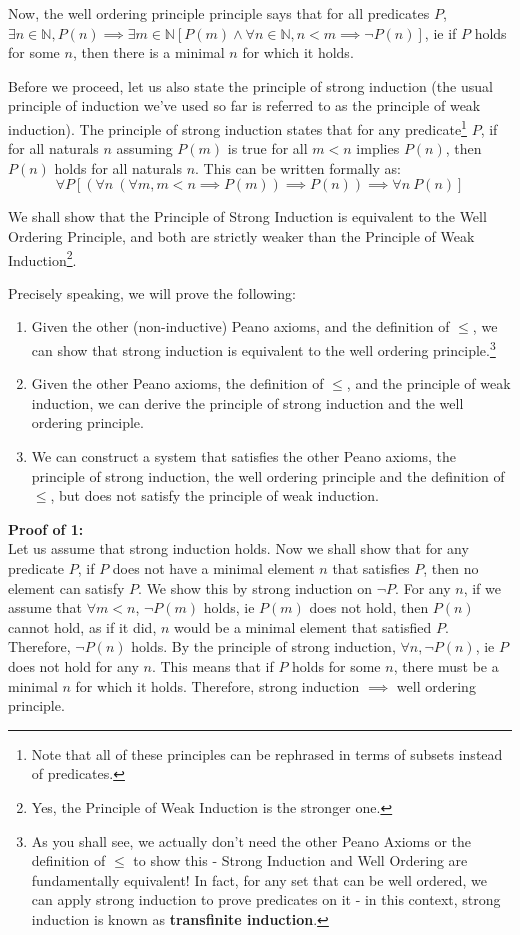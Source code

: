 \documentclass[12pt]{report}
\begin{document}
Now, the well ordering principle principle says that for all predicates $P$, $\exists n \in \mathbb{N}, P(n) \implies \exists m \in \mathbb{N} \left[P(m) \land \forall n \in \mathbb{N}, n < m \implies \neg P(n)\right]$, ie if $P$ holds for some $n$, then there is a minimal $n$ for which it holds. 

Before we proceed, let us also state the principle of strong induction (the usual principle of induction we've used so far is referred to as the principle of weak induction). The principle of strong induction states that for any predicate\footnote{Note that all of these principles can be rephrased in terms of subsets instead of predicates.} $P$, if for all naturals $n$ assuming $P(m)$ is true for all $m < n$ implies $P(n)$, then $P(n)$ holds for all naturals $n$. This can be written formally as:
\begin{equation*}
  \forall P \left[(\forall n\ (\forall m, m < n \implies P(m)) \implies P(n)) \implies \forall n\ P(n)\right]
\end{equation*} 

We shall show that the Principle of Strong Induction is equivalent to the Well Ordering Principle, and both are strictly weaker than the Principle of Weak Induction\footnote{Yes, the Principle of Weak Induction is the stronger one.}.

Precisely speaking, we will prove the following:
\begin{enumerate}
  \item Given the other (non-inductive) Peano axioms, and the definition of $\leq$, we can show that strong induction is equivalent to the well ordering principle.\footnote{As you shall see, we actually don't need the other Peano Axioms or the definition of $\leq$ to show this - Strong Induction and Well Ordering are fundamentally equivalent! In fact, for any set that can be well ordered, we can apply strong induction to prove predicates on it - in this context, strong induction is known as \textbf{transfinite induction}.}
  \item Given the other Peano axioms, the definition of $\leq$, and the principle of weak induction, we can derive the principle of strong induction and the well ordering principle.
  \item We can construct a system that satisfies the other Peano axioms, the principle of strong induction, the well ordering principle and the definition of $\leq$, but does not satisfy the principle of weak induction.
\end{enumerate}
\textbf{Proof of 1:}\\
Let us assume that strong induction holds. Now we shall show that for any predicate $P$, if $P$ does not have a minimal element $n$ that satisfies $P$, then no element can satisfy $P$. We show this by strong induction on $\neg P$. For any $n$, if we assume that $\forall m < n$, $\neg P(m)$ holds, ie $P(m)$ does not hold, then $P(n)$ cannot hold, as if it did, $n$ would be a minimal element that satisfied $P$. Therefore, $\neg P(n)$ holds. By the principle of strong induction, $\forall n, \neg P(n)$, ie $P$ does not hold for any $n$. This means that if $P$ holds for some $n$, there must be a minimal $n$ for which it holds. Therefore, strong induction $\implies$ well ordering principle.
\end{document}

